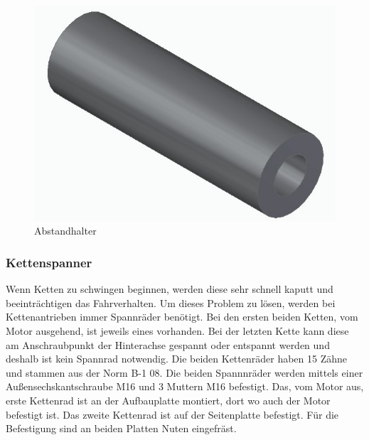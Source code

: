\begin{figure} [H]
	\begin{center}
		\includegraphics[scale=0.3]{figures/mechanik/Seitenplatte_Abstandhalter.jpg}
			\caption{Abstandhalter}
			\label{Abstandhalter}
	\end{center}
\end{figure}

\subsubsection*{Kettenspanner}

Wenn Ketten zu schwingen beginnen, werden diese sehr schnell kaputt und beeinträchtigen das Fahrverhalten. Um dieses Problem zu lösen, werden bei Kettenantrieben immer Spannräder benötigt. Bei den ersten beiden Ketten, vom Motor ausgehend, ist jeweils eines vorhanden. Bei der letzten Kette kann diese am Anschraubpunkt der Hinterachse gespannt oder entspannt werden und deshalb ist kein Spannrad notwendig. Die beiden Kettenräder haben 15 Zähne und stammen aus der Norm B-1 08. Die beiden Spannnräder werden mittels einer Außensechskantschraube M16 und 3 Muttern M16 befestigt. Das, vom Motor aus, erste Kettenrad ist an der Aufbauplatte montiert, dort wo auch der Motor befestigt ist. Das zweite Kettenrad ist auf der Seitenplatte befestigt.  Für die Befestigung sind an beiden Platten Nuten eingefräst.


